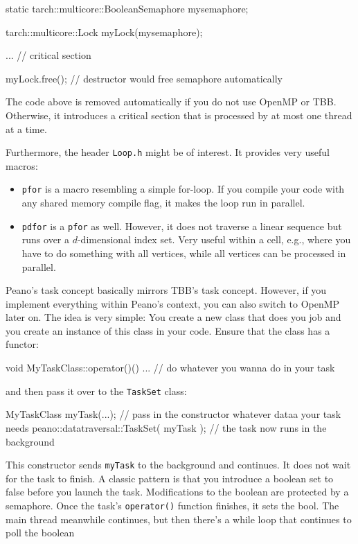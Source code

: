 \begin{code}
  static tarch::multicore::BooleanSemaphore  mysemaphore;
  
  
  tarch::multicore::Lock   myLock(mysemaphore);
  
  ...            // critical section
  
  myLock.free(); // destructor would free semaphore automatically
\end{code}


\noindent
The code above is removed automatically if you do not use OpenMP or TBB.
Otherwise, it introduces a critical section that is processed by at most one
thread at a time.

Furthermore, the header \texttt{Loop.h} might be of interest. 
It provides very useful macros:
\begin{itemize}
  \item \texttt{pfor} is a macro resembling a simple for-loop. If you compile
  your code with any shared memory compile flag, it makes the loop run in
  parallel.
  \item \texttt{pdfor} is a \texttt{pfor} as well. However, it does not traverse
  a linear sequence but runs over a $d$-dimensional index set. Very useful
  within a cell, e.g., where you have to do something with all vertices, while
  all vertices can be processed in parallel.
\end{itemize}


Peano's task concept basically mirrors TBB's task concept. 
However, if you implement everything within Peano's context, you can also switch
to OpenMP later on.
The idea is very simple: You create a new class that does you job and
you create an instance of this class in your code.
Ensure that the class has a functor:

\begin{code}
  void MyTaskClass::operator()() {
   ...   // do whatever you wanna do in your task 
  } 
\end{code}

\noindent
and then pass it over to the \texttt{TaskSet} class:

\begin{code}
  MyTaskClass myTask(...); // pass in the constructor whatever dataa your task needs 
  peano::datatraversal::TaskSet( myTask ); // the task now runs in the background
\end{code}

\noindent
This constructor sends \texttt{myTask} to the background and continues. 
It does not wait for the task to finish.
A classic pattern is that you introduce a boolean set to false before you launch
the task.
Modifications to the boolean are protected by a semaphore.
Once the task's \texttt{operator()} function finishes, it sets the bool.
The main thread meanwhile continues, but then there's a while loop that
continues to poll the boolean

